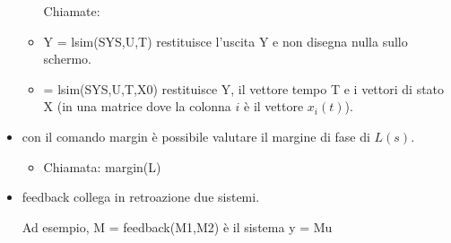 \documentclass[10pt,a4paper]{book}
\begin{document}
\begin{itemize}
\begin{itemize}
	      	Chiamate:
	      	\item {\selectfont Y = lsim(SYS,U,T)} restituisce l’uscita {\selectfont Y} e non disegna nulla sullo schermo.
	      	\item {\selectfont [Y,T,X] = lsim(SYS,U,T,X0)} restituisce {\selectfont Y}, il vettore tempo {\selectfont T} e i vettori di stato {\selectfont X} (in una matrice dove la colonna $i$ è il vettore $x_i(t)$).
	      \end{itemize}

	\item con il comando {\selectfont margin} è possibile valutare il margine di fase di $L(s)$.
		\begin{itemize}
			\item Chiamata: {\selectfont margin(L)}
		\end{itemize}

	\item {\selectfont feedback} collega in retroazione due sistemi.
	      
	      Ad esempio, {\selectfont M = feedback(M1,M2)} è il sistema {\selectfont y = Mu}
	      
	      
	      \begin{tikzpicture}[x=0.75pt,y=0.75pt,yscale=-1,xscale=1]
	      	

\end{tikzpicture}
\end{itemize}
\end{document}
